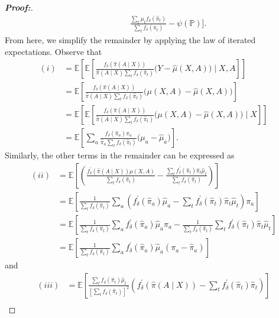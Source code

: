 \documentclass[11pt,twoside]{article}
\theoremstyle{definition}
\theoremstyle{remark}
\begin{document}
\begin{proof}[\textbf{Proof:}]
\begin{align*}
    &\phantom{{}={\mathbb{E}_\mathbb{P}\Bigg[}} \frac{\sum_t  \mu_t f_\delta(\widehat{\pi}_t )}{\sum_t f_\delta(\widehat{\pi}_t)} - \psi(\mathbb{P}) \Bigg]. \tag{$iv$}
\end{align*}
From here, we simplify the remainder by applying the law of iterated expectations. Observe that
\begin{align*}
    (i) &= \mathbb{E}\left[ \mathbb{E}\left[ \frac{f_\delta(\widehat{\pi}(A \mid X))}{\widehat{\pi}(A \mid X) \sum_t f_\delta(\widehat{\pi}_t)}\Big(Y - \widehat{\mu}(X, A) \Big) \mid X, A \right]\right] \\
    &= \mathbb{E}\left[  \frac{f_\delta(\widehat{\pi}(A \mid X))}{\widehat{\pi}(A \mid X) \sum_t f_\delta(\widehat{\pi}_t)}\Big(\mu(X, A) - \widehat{\mu}(X, A) \Big) \right] \\
    &= \mathbb{E}\left[ \mathbb{E}\left[  \frac{f_\delta(\widehat{\pi}(A \mid X))}{\widehat{\pi}(A \mid X) \sum_t f_\delta(\widehat{\pi}_t)}\Big(\mu(X, A) - \widehat{\mu}(X, A) \Big) \mid X \right] \right] \\
    &= \mathbb{E}\left[ \sum_a   \frac{f_\delta(\widehat{\pi}_a) \pi_a}{\widehat{\pi}_a \sum_t f_\delta(\widehat{\pi}_t)}\Big(\mu_a - \widehat{\mu}_a \Big)  \right]. 
\end{align*}
Similarly, the other terms in the remainder can be expressed as
\begin{align*}
    (ii) &= \mathbb{E}\left[\left( \frac{f^{\prime}_\delta(\widehat{\pi}(A \mid X)) \widehat{\mu}(X, A)}{\sum_t f_\delta(\widehat{\pi}_t)} - \frac{\sum_t f^{\prime}_\delta(\widehat{\pi}_t) \widehat{\pi}_t \widehat{\mu}_t}{\sum_t f_\delta(\widehat{\pi}_t)} \right) \right] \\
    &= \mathbb{E}\left[ \frac{1}{\sum_t f_\delta(\widehat{\pi}_t)}\sum_a \left( f^{\prime}_\delta(\widehat{\pi}_a) \widehat{\mu}_a - \sum_t f^{\prime}_\delta(\widehat{\pi}_t) \widehat{\pi}_t \widehat{\mu}_t \right)\pi_a  \right] \\
    &= \mathbb{E}\left[ \frac{1}{\sum_t f_\delta(\widehat{\pi}_t)}\sum_a  f^{\prime}_\delta(\widehat{\pi}_a) \widehat{\mu}_a \pi_a - \frac{1}{\sum_t f_\delta(\widehat{\pi}_t)}\sum_t f^{\prime}_\delta(\widehat{\pi}_t) \widehat{\pi}_t \widehat{\mu}_t  \right] \\
    &= \mathbb{E}\left[ \frac{1}{\sum_t f_\delta(\widehat{\pi}_t)}\sum_a  f^{\prime}_\delta(\widehat{\pi}_a) \widehat{\mu}_a (\pi_a -  \widehat{\pi}_a)  \right] 
\end{align*}
and
\begin{align*}
    (iii) &= \mathbb{E}\left[\frac{\sum_t f_\delta( \widehat{\pi}_t) \widehat{\mu}_t}{\left[\sum_t f_\delta(\widehat{\pi}_t) \right]^2} \left(f^\prime_\delta( \widehat{\pi}(A \mid X)) - \sum_t f^\prime_\delta( \widehat{\pi}_t) \widehat{\pi}_t \right) \right] \\

\end{align*}
\end{proof}
\end{document}
